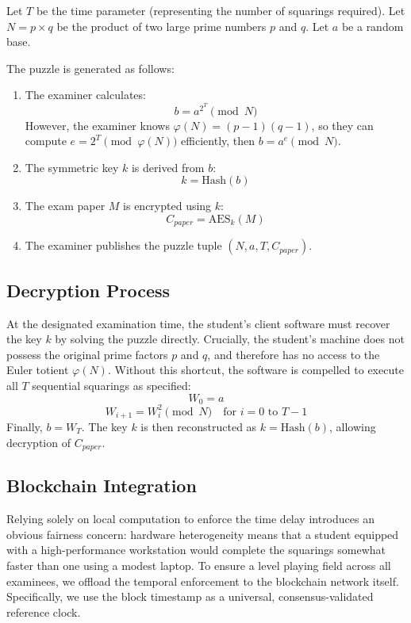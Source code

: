 \documentclass[final,5p,times]{elsarticle}
\begin{document}
Let $T$ be the time parameter (representing the number of squarings required).
Let $N = p \times q$ be the product of two large prime numbers $p$ and $q$.
Let $a$ be a random base.

The puzzle is generated as follows:
\begin{enumerate}
    \item The examiner calculates:
    \begin{equation}
    b = a^{2^T} \pmod N
    \end{equation}
    However, the examiner knows $\varphi(N) = (p-1)(q-1)$, so they can compute $e = 2^T \pmod{\varphi(N)}$ efficiently, then $b = a^e \pmod N$.
    \item The symmetric key $k$ is derived from $b$:
    \begin{equation}
    k = \text{Hash}(b)
    \end{equation}
    \item The exam paper $M$ is encrypted using $k$:
    \begin{equation}
    C_{paper} = \text{AES}_k(M)
    \end{equation}
    \item The examiner publishes the puzzle tuple $(N, a, T, C_{paper})$.
\end{enumerate}

\subsection{Decryption Process}
At the designated examination time, the student's client software must recover the key $k$ by solving the puzzle directly. Crucially, the student's machine does not possess the original prime factors $p$ and $q$, and therefore has no access to the Euler totient $\varphi(N)$. Without this shortcut, the software is compelled to execute all $T$ sequential squarings as specified:
\begin{equation}
W_0 = a
\end{equation}
\begin{equation}
W_{i+1} = W_i^2 \pmod N \quad \text{for } i = 0 \text{ to } T-1
\end{equation}
Finally, $b = W_T$. The key $k$ is then reconstructed as $k = \text{Hash}(b)$, allowing decryption of $C_{paper}$.

\subsection{Blockchain Integration}
Relying solely on local computation to enforce the time delay introduces an obvious fairness concern: hardware heterogeneity means that a student equipped with a high-performance workstation would complete the squarings somewhat faster than one using a modest laptop. To ensure a level playing field across all examinees, we offload the temporal enforcement to the blockchain network itself. Specifically, we use the block timestamp as a universal, consensus-validated reference clock.
\end{document}
